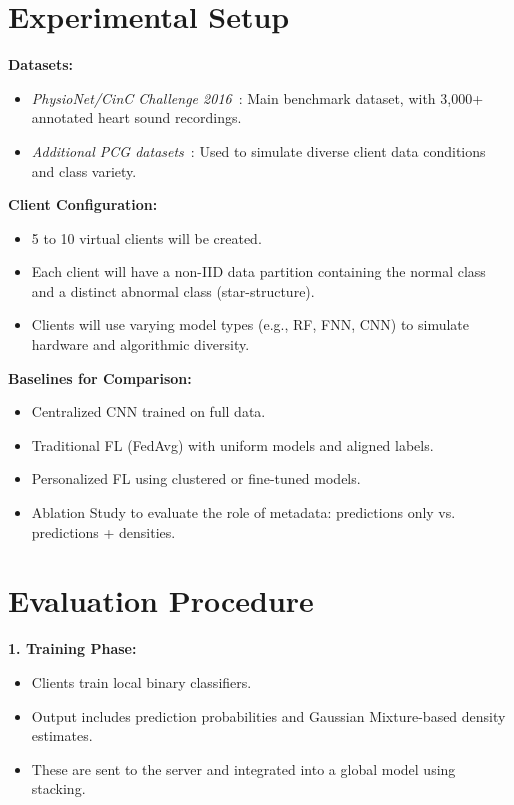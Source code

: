 \section{Experimental Setup}
\label{sec:experimental_setup}

\textbf{Datasets:}
\begin{itemize}
    \item \textit{PhysioNet/CinC Challenge 2016}~\cite{clifford2016classification}: Main benchmark dataset, with 3,000+ annotated heart sound recordings.
    \item \textit{Additional PCG datasets}~\cite{liu2016open}: Used to simulate diverse client data conditions and class variety.
\end{itemize}

\textbf{Client Configuration:}
\begin{itemize}
    \item 5 to 10 virtual clients will be created.
    \item Each client will have a non-IID data partition containing the normal class and a distinct abnormal class (star-structure).
    \item Clients will use varying model types (e.g., RF, FNN, CNN) to simulate hardware and algorithmic diversity.
\end{itemize}

\textbf{Baselines for Comparison:}
\begin{itemize}
    \item Centralized CNN trained on full data.
    \item Traditional FL (FedAvg) with uniform models and aligned labels.
    \item Personalized FL using clustered or fine-tuned models.
    \item Ablation Study to evaluate the role of metadata: predictions only vs. predictions + densities.
\end{itemize}

\section{Evaluation Procedure}
\label{sec:evaluation_procedure}

\textbf{1. Training Phase:}
\begin{itemize}
    \item Clients train local binary classifiers.
    \item Output includes prediction probabilities and Gaussian Mixture-based density estimates.
    \item These are sent to the server and integrated into a global model using stacking.
\end{itemize}


